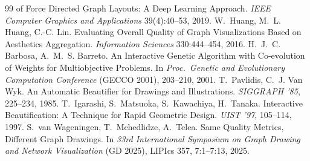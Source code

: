 \documentclass[11pt]{article}
\begin{document}
{\begin{thebibliography}{99}
 of Force Directed Graph Layouts: A Deep Learning Approach. \emph{IEEE Computer Graphics
 and Applications} 39(4):40--53, 2019.
 W.~Huang, M.~L. Huang, C.-C. Lin. Evaluating Overall Quality of Graph
 Visualizations Based on Aesthetics Aggregation. \emph{Information Sciences} 330:444--454,
 2016.
 H.~J.~C. Barbosa, A.~M.~S. Barreto. An Interactive Genetic Algorithm
 with Co-evolution of Weights for Multiobjective Problems. In \emph{Proc.\ Genetic and
 Evolutionary Computation Conference} (GECCO 2001), 203--210, 2001.
 T.~Pavlidis, C.~J. Van Wyk. An Automatic Beautifier for Drawings and
 Illustrations. \emph{SIGGRAPH '85}, 225--234, 1985.
 T.~Igarashi, S.~Matsuoka, S.~Kawachiya, H.~Tanaka. Interactive
 Beautification: A Technique for Rapid Geometric Design. \emph{UIST '97}, 105--114, 1997.
 S.~van Wageningen, T.~Mchedlidze, A.~Telea. Same Quality Metrics,
 Different Graph Drawings. In \emph{33rd International Symposium on Graph Drawing and
 Network Visualization} (GD 2025), LIPIcs 357, 7:1--7:13, 2025.
\end{thebibliography}}
\end{document}
